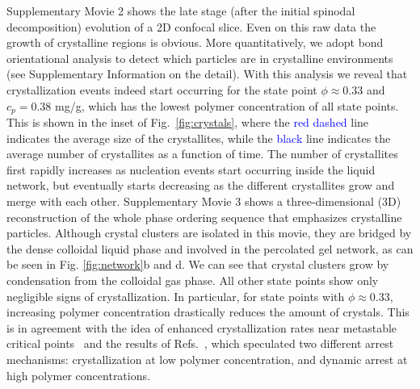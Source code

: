 \documentclass[preprint,amsmath,amssymb,superscriptaddress]{revtex4-1}
\begin{document}
Supplementary Movie 2 shows the late stage (after the initial spinodal decomposition) evolution of a 2D confocal slice. Even on this raw data the growth of crystalline regions is obvious. More quantitatively, we adopt bond orientational analysis to detect which particles are in crystalline environments~\cite{russo2013interplay} 
(see Supplementary Information on the detail). 
With this analysis we reveal that crystallization events indeed start occurring for the state point $\phi\approx 0.33$ and $c_p=0.38$ mg/g, which has the lowest
polymer concentration of all state points. This is shown in the inset of Fig.~\ref{fig:crystals}, where the \textcolor{blue}{red dashed} line indicates the average size of the crystallites, 
while the \textcolor{blue}{black} line indicates the average number of crystallites as a function of time. The number of crystallites first rapidly increases as nucleation events
start occurring inside the liquid network, but eventually starts decreasing as the different crystallites grow and merge with each other.  Supplementary Movie 3 shows a three-dimensional (3D) reconstruction  of the whole phase ordering sequence that emphasizes crystalline particles. Although crystal clusters are isolated in this movie, they are bridged by the dense colloidal liquid phase and involved in the percolated gel network, as can be seen in Fig. \ref{fig:network}b and d. 
We can see that crystal clusters grow by condensation from the colloidal gas phase. 
All other state points show only negligible signs of crystallization. In particular, for state points with $\phi\approx 0.33$, increasing
polymer concentration drastically reduces the amount of crystals. This is in agreement with the
idea of enhanced crystallization rates near metastable critical points~\cite{ten1997enhancement,olmsted1998spinodal} and the
results of Refs.~\cite{soga1999metastable,fortini2008crystallization,perez2011pathways},
which speculated two different arrest mechanisms: crystallization at low polymer concentration, and dynamic arrest at high polymer concentrations.
\end{document}
